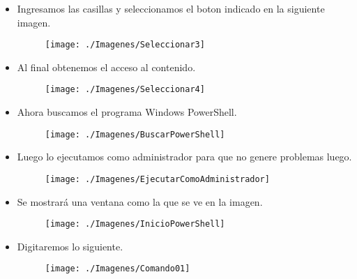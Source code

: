 \begin{itemize}
\begin{figure}[htb]
				\end{figure}
				\vspace{5cm}
			\item Ingresamos las casillas y seleccionamos el boton indicado en la siguiente imagen.
				\begin{figure}[htb]
					\begin{center}
						\texttt{[image: ./Imagenes/Seleccionar3]}
					\end{center}
				\end{figure}
			\item Al final obtenemos el acceso al contenido.
				\begin{figure}[htb]
					\begin{center}
						\texttt{[image: ./Imagenes/Seleccionar4]}
					\end{center}
				\end{figure}
				\vspace{7cm}
			\item Ahora buscamos el programa Windows PowerShell.
					\begin{figure}[htb]
						\begin{center}
							\texttt{[image: ./Imagenes/BuscarPowerShell]}
						\end{center}
					\end{figure}
				\item Luego lo ejecutamos como administrador para que no genere problemas luego.
					\begin{figure}[htb]
						\begin{center}
							\texttt{[image: ./Imagenes/EjecutarComoAdministrador]}
						\end{center}
					\end{figure}
				\item Se mostrará una ventana como la que se ve en la imagen.
					\begin{figure}[htb]
						\begin{center}
							\texttt{[image: ./Imagenes/InicioPowerShell]}
						\end{center}
					\end{figure}
					\vspace{7cm}
				\item Digitaremos lo siguiente.
					\begin{figure}[htb]
						\begin{center}
							\texttt{[image: ./Imagenes/Comando01]}
						\end{center}
					\end{figure}
	\end{itemize}